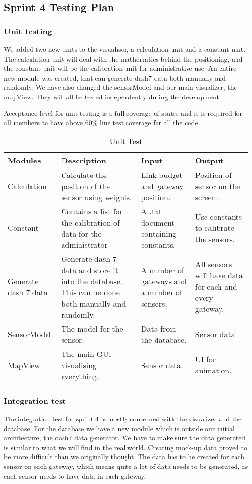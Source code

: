 \documentclass[../document]{subfiles}
\begin{document}
\subsection{Sprint 4 Testing Plan}
\label{test_plan_sprint_4}

\subsubsection{Unit testing}
We added two new units to the visualiser, a calculation unit and a constant unit. The calculation unit will deal with the mathematics behind the positioning, and the constant unit will be the calibration unit for administrative use. An entire new module was created, that can generate dash7 data both manually and randomly. We have also changed the sensorModel and our main visualizer, the mapView. They will all be tested independently during the development. 

Acceptance level for unit testing is a full coverage of states and it is required for all members to have above 60\% line test coverage for all the code.

\begin{table}[H]
\caption{Unit Test}
\centering
\begin{tabularx}{\textwidth}{|X|X|X|X|}
	\hline
	Modules
	&Description
	&Input
	&Output
	\\ \hline Calculation
	&Calculate the position of the sensor using weights.
	&Link budget and gateway position.
	&Position of sensor on the screen.
	\\ \hline Constant
	&Contains a list for the calibration of data for the administrator
	&A .txt document containing constants.
	&Use constants to calibrate the sensors.
	\\ \hline Generate dash 7 data
	&Generate dash 7 data and store it into the database. This can be done both manually and randomly. 
	&A number of gateways and a number of sensors.
	&All sensors will have data for each and every gateway.
	\\ \hline SensorModel
	&The model for the sensor.
	&Data from the database.
	&Sensor data.
	\\ \hline MapView
	&The main GUI visualising everything.
	&Sensor data.
	&UI for animation.
	\\ \hline 
\end{tabularx}
\end{table}

\subsubsection{Integration test}
The integration test for sprint 4 is mostly concerned with the visualizer and the database. For the database we have a new module which is outside our initial architecture, the dash7 data generator. We have to make sure the data generated is similar to what we will find in the real world. Creating mock-up data proved to be more difficult than we originally thought. The data has to be created for each sensor on each gateway, which means quite a lot of data needs to be generated, as each sensor needs to have data in each gateway. 
\end{document}
